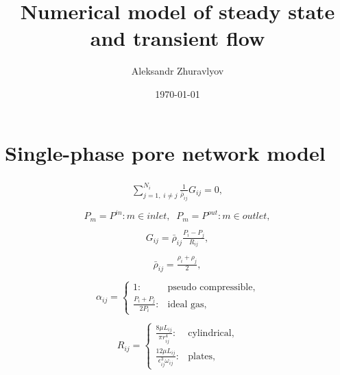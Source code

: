 \documentclass[a4paper,12pt]{extreport}
\author{Aleksandr Zhuravlyov}
\title{Numerical model of steady state and transient flow}
\date{\today}
\begin{document}
    \pagecolor{pageColor}
    \color{fontColor}

    \section*{Single-phase pore network model}

    \begin{eqnarray}
    \label{one_phase} 
    \begin{gathered}
    \sum^{N_{i}}_{j=1, \; i\neq j} \frac{1}{\bar{\rho}_{ij}}G_{ij} = 0,
    \end{gathered}
    \end{eqnarray}
    \begin{eqnarray}
    \begin{gathered}
    \label{press_bound}
    P_{m} = P^{in}   : m \in inlet, \;\;
    P_{m} = P^{out}   :m \in outlet,
    \end{gathered}
    \end{eqnarray}
    \begin{eqnarray}
    \begin{gathered}
    \label{eq:mass_flux_simple_pnm}
    G_{ij} = \bar{\rho}_{ij} \frac{P_{i} - P_{j}}{R_{ij}},
    \end{gathered}
    \end{eqnarray}
     \begin{eqnarray}
    \begin{gathered}
    \bar{\rho}_{ij} = \frac{\rho_{i}+\rho_{j}}{2},
    \end{gathered}
    \end{eqnarray}
    \begin{eqnarray}
        \begin{gathered}
            \alpha_{ij} =\begin{cases}
                             1: &\text{pseudo compressible},\\
                             \frac{P_i + P_j}{2P_i}: &\text{ideal gas},
            \end{cases}
        \end{gathered}
    \end{eqnarray}
\begin{eqnarray}
\begin{gathered}
R_{ij} =\begin{cases}
\frac{8 \mu L_{ij}}{\pi r_{ij}^{4}}: &\text{cylindrical},\\
\frac{12 \mu L_{ij}}{\epsilon_{ij}^{3} \omega_{ij}}: &\text{plates},
\end{cases}
\end{gathered}
\end{eqnarray}
\end{document}
